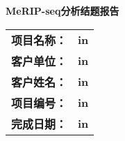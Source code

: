 \documentclass[a4paper,8pt]{report}
\begin{document}
\begin{titlepage}
    \begin{center}
        \vspace*{8cm}

        \textbf{\huge MeRIP-seq分析结题报告}
        
        \vspace{8cm}
       
        \begin{center}
        \begin{tabular}{ c c }
            {\bf \large 项目名称：} & {\bf \large in}\\ 
            {\bf \large 客户单位：} & {\bf \large in}\\ 
            {\bf \large 客户姓名：} & {\bf \large in}\\
            {\bf \large 项目编号：} & {\bf \large in}\\
            {\bf \large 完成日期：} & {\bf \large in}\\
        \end{tabular}
        \end{center}
            
    \end{center}
\end{titlepage}
\end{document}
